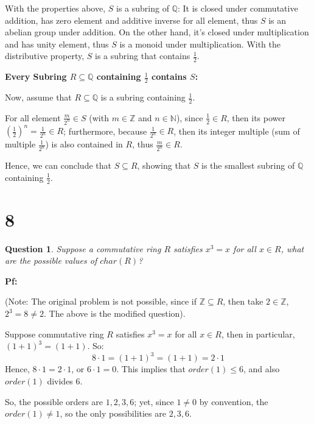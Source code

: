 \documentclass{article}
\newtheorem{question}{Question}
\begin{document}
With the properties above, $S$ is a subring of $\mathbb{Q}$:
It is closed under commutative addition, has zero element and additive inverse for all element, thus $S$ is an abelian group under addition.
On the other hand, it's closed under multiplication and has unity element, thus $S$ is a monoid under multiplication.
With the distributive property, $S$ is a subring that contains $\frac{1}{2}$.

\hfill

\textbf{Every Subring $R\subseteq \mathbb{Q}$ containing $\frac{1}{2}$ contains $S$:}

Now, assume that $R\subseteq \mathbb{Q}$ is a subring containing $\frac{1}{2}$.

For all element $\frac{m}{2^n}\in S$ (with $m\in\mathbb{Z}$ and $n\in\mathbb{N}$), since $\frac{1}{2}\in R$, then its power $(\frac{1}{2})^n = \frac{1}{2^n}\in R$;
furthermore, because $\frac{1}{2^n}\in R$, then its integer multiple (sum of multiple $\frac{1}{2^n}$) is also contained in $R$, thus $\frac{m}{2^n}\in R$.

Hence, we can conclude that $S\subseteq R$, showing that $S$ is the smallest subring of $\mathbb{Q}$ containing $\frac{1}{2}$.

\break


\section*{8}
\begin{myBox}[]{}
    \begin{question}
        Suppose a commutative ring $R$ satisfies $x^3=x$ for all $x\in R$, what are the possible values of $char(R)$?
    \end{question}
\end{myBox}

\textbf{Pf:}

(Note: The original problem is not possible, since if $\mathbb{Z}\subseteq R$, then take $2\in \mathbb{Z}$, $2^3=8\neq 2$. The above is the modified question).

\hfill

Suppose commutative ring $R$ satisfies $x^3=x$ for all $x\in R$, then in particular, $(1+1)^3 = (1+1)$. So:
$$8\cdot 1 = (1+1)^3 = (1+1)=2\cdot 1$$ 
Hence, $8\cdot 1 = 2\cdot 1$, or $6\cdot 1 = 0$. This implies that $order(1) \leq 6$, and also $order(1)$ divides 6.

So, the possible orders are $1,2,3,6$; yet, since $1\neq 0$ by convention, the $order(1)\neq 1$, so the only possibilities are $2,3,6$.
\end{document}
